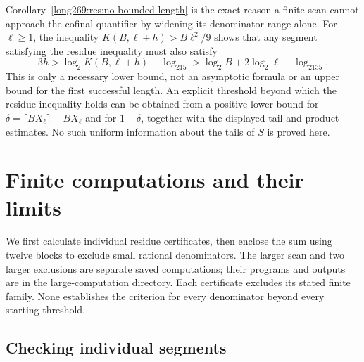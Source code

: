 \documentclass[11pt]{article}
\theoremstyle{remark}
\theoremstyle{plain}
\begin{document}
\noindent Corollary~\ref{long269:res:no-bounded-length} is the exact reason a finite
scan cannot approach the cofinal quantifier by widening its denominator range
alone.  For $\ell\ge1$, the inequality
$K(B,\ell+h)>B\ell^2/9$ shows that any segment satisfying the residue inequality must also satisfy
\[
 3h>\log_2K(B,\ell+h)-\log_215
    >\log_2B+2\log_2\ell-\log_2135.
\]
This is only a necessary lower bound, not an asymptotic formula or an
upper bound for the first successful length.
An explicit threshold beyond which the residue inequality holds can be obtained from a positive
lower bound for $\delta=\lceil BX_\ell\rceil-BX_\ell$ and for $1-\delta$,
together with the displayed tail and product estimates.  No such uniform information about the tails of $S$ is proved here.

\section{Finite computations and their limits}\label{long269:sec:evidence}

We first calculate individual residue certificates, then enclose the
sum using twelve blocks to exclude small rational denominators. The
larger scan and two larger exclusions are separate saved computations;
their programs and outputs are in the
\href{https://github.com/wcook04/plectis-erdos/tree/f757115e03bebe5c04431a147da559015c680a37/research/experiments/erdos269/large-computations}{large-computation directory}.
Each certificate excludes its stated finite family. None establishes
the criterion for every denominator beyond every starting threshold.

\subsection{Checking individual segments}
\end{document}
